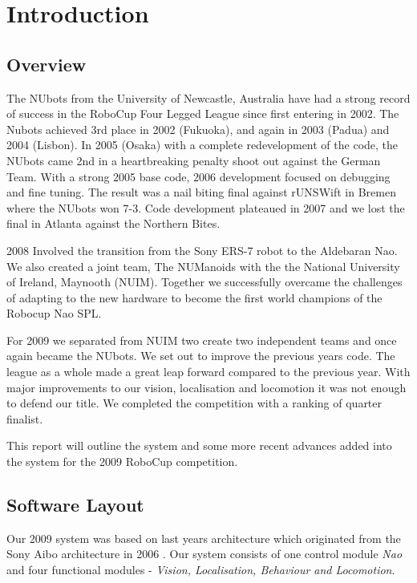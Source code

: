 \section{Introduction}

\subsection{Overview}

The NUbots from the University of Newcastle, Australia have had a strong record of success in the RoboCup Four Legged League since first entering in 2002. The Nubots achieved 3rd place in 2002 (Fukuoka), and again in 2003 (Padua) and 2004 (Lisbon). In 2005 (Osaka) with a complete redevelopment of the code, the NUbots came 2nd in a heartbreaking penalty shoot out against the German Team. With a strong 2005 base code, 2006 development focused on debugging and fine tuning. The result was a nail biting final against rUNSWift in Bremen where the NUbots won 7-3. Code development plateaued in 2007 and we lost the final in Atlanta against the Northern Bites.  

2008 Involved the transition from the Sony ERS-7 robot to the Aldebaran Nao. We also created a joint team, The NUManoids with the the National University of Ireland, Maynooth (NUIM). Together we successfully overcame the challenges of adapting to the new hardware to become the first world champions of the Robocup Nao SPL.

For 2009 we separated from NUIM two create two independent teams and once again became the NUbots. We set out to improve the previous years code. The league as a whole made a great leap forward compared to the previous year. With major improvements to our vision, localisation and locomotion it was not enough to defend our title. We completed the competition with a ranking of quarter finalist.

This report will outline the system and some more recent advances added into the system for the 2009 RoboCup competition.

\subsection{Software Layout}

Our 2009 system was based on last years architecture \cite{NUManoids2008} which originated from the Sony Aibo architecture in 2006 \cite{NUBOT2006}. Our system consists of one control module \emph{Nao} and four functional modules -
\emph{Vision, Localisation, Behaviour and Locomotion}. 

